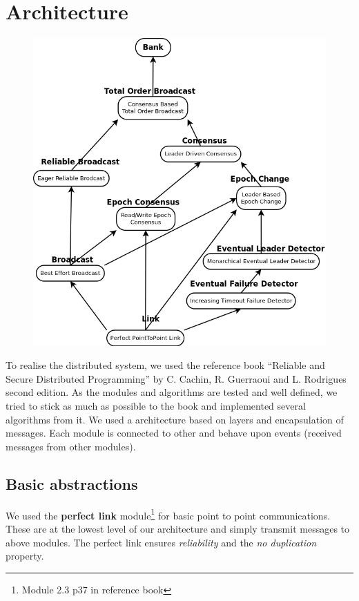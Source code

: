 \documentclass[11pt,english,a4paper]{article}
\begin{document}
\section{Architecture}
\begin{figure}[h]\centering
  \includegraphics[width=\textwidth]{arch.png}
\end{figure}
To realise the distributed system, we used the reference book ``Reliable and Secure Distributed Programming'' by C. Cachin, R. Guerraoui and L. Rodrigues second edition.
As the modules and algorithms are tested and well defined, we tried to stick as much as possible to the book and implemented several algorithms from it.
We used a architecture based on layers and encapsulation of messages.
Each module is connected to other and behave upon events (received messages from other modules).

\subsection*{Basic abstractions}
We used the \textbf{perfect link} module\footnote{Module 2.3 p37 in reference book} for basic point to point communications.
These are at the lowest level of our architecture and simply transmit messages to above modules.
The perfect link ensures \emph{reliability} and the \emph{no duplication} property.\\
\end{document}

